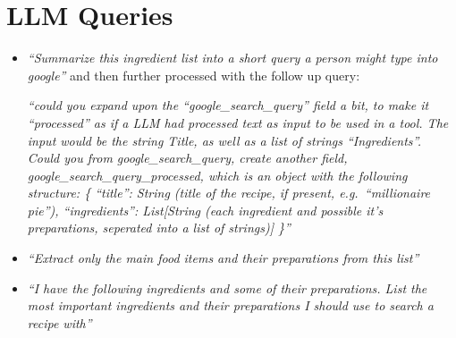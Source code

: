 \documentclass[11pt]{article}
\begin{document}
\section{LLM Queries}\label{app:llm}
\begin{itemize}
\item \emph{``Summarize this ingredient list into a short query a person might type
    into google''} and then further processed with the follow up query:

    \emph{``could you expand upon the “google\_search\_query” field a bit, to make it “processed” as if a LLM had processed text as input to be used in a tool.
        The input would be the string Title, as well as a list of strings “Ingredients”.
        Could you from google\_search\_query, create another field,
        google\_search\_query\_processed, which is an object with the following structure:
\{
“title”: String (title of the recipe, if present, e.g.\ ``millionaire pie''),
“ingredients”: List[String (each ingredient and possible it’s preparations, seperated into a list of strings)]
\}''}
\item \emph{``Extract only the main food items and their preparations from
    this list''}
\item \emph{``I have the following ingredients and some of their
        preparations. List the most important ingredients and their
    preparations I should use to search a recipe with''} 
\end{itemize}
\end{document}

